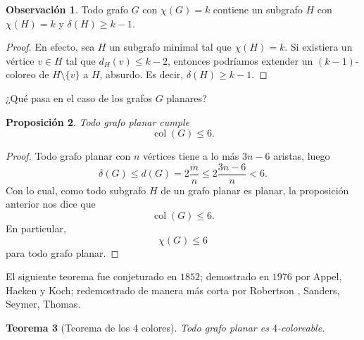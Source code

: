 \documentclass[12pt]{report}
\theoremstyle{plain}
\newtheorem{theorem}{Teorema}[section]
\newtheorem{proposition}[theorem]{Proposición}
\theoremstyle{definition}
\newtheorem{obs}[theorem]{Observación}
\newcommand{\col}[1]{\operatorname{col} (#1)}
\begin{document}
\begin{obs}
Todo grafo $G$ con $\chi (G) = k$ contiene un subgrafo $H$ con $\chi (H) = k$ y $\delta (H) \geq k -1$.
\end{obs}
\begin{proof}
En efecto, sea $H$ un subgrafo minimal tal que $\chi (H) = k$. Si existiera un vértice $v \in H$ tal que $d_H (v) \leq k-2$, entonces podríamos extender un $(k-1)$-coloreo de $H \setminus \{v\}$ a $H$, absurdo. Es decir, $\delta (H) \geq k-1$.
\end{proof}


\bigskip


¿Qué pasa en el caso de los grafos $G$ planares?

\begin{proposition}
Todo grafo planar cumple
\[
    \col G \leq 6.
\]
\end{proposition}
\begin{proof}
Todo grafo planar con $n$ vértices tiene a lo más $3n - 6$ aristas, luego
\[
    \delta (G) \leq d(G) = 2 \frac{m} n \leq 2 \frac{3 n - 6} n < 6.
\]
Con lo cual, como todo subgrafo $H$ de un grafo planar es planar, la proposición anterior nos dice que
\[
    \col G \leq 6.
\]
En particular,
\[
    \chi (G) \leq 6
\]
para todo grafo planar.
\end{proof}




El siguiente teorema fue conjeturado en $1852$; demostrado en $1976$ por Appel, Hacken y Koch; redemostrado de manera más corta por Robertson , Sanders, Seymer, Thomas.
\begin{theorem}[Teorema de los $4$ colores]\label{th:teorema del los 4 colores - para grafos planares}
Todo grafo planar es $4$-coloreable.
\end{theorem}
\end{document}
